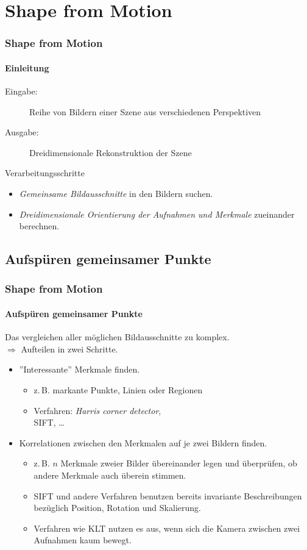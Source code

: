 \documentclass{beamer}
\begin{document}
\section{Shape from Motion}
\begin{frame}
	\frametitle{Shape from Motion}
	\framesubtitle{Einleitung}

	\begin{description}
		\item[Eingabe:] Reihe von Bildern einer Szene aus verschiedenen Perspektiven
		\item[Ausgabe:] Dreidimensionale Rekonstruktion der Szene
	\end{description}

	\begin{block}{Verarbeitungsschritte}
		\begin{itemize}
			\item \emph{Gemeinsame Bildausschnitte} in den Bildern suchen.
			\item \emph{Dreidimensionale Orientierung der Aufnahmen und Merkmale} zueinander berechnen.
		\end{itemize}
	\end{block}
\end{frame}


\subsection{Aufspüren gemeinsamer Punkte}
\begin{frame}
	\frametitle{Shape from Motion}
	\framesubtitle{Aufspüren gemeinsamer Punkte}
	
	Das vergleichen aller möglichen Bildausschnitte zu komplex. \pause \\
	$\Rightarrow$ Aufteilen in zwei Schritte.
	
	\begin{itemize}
		\item ''Interessante'' Merkmale finden.
			\begin{itemize}
				\item<3-> z.\,B. markante Punkte, Linien oder Regionen
				\item<3-> Verfahren: \emph{Harris corner detector}, \\
				\acf{SIFT}, \dots
			\end{itemize}
		\item Korrelationen zwischen den Merkmalen auf je zwei Bildern finden.
			\begin{itemize}
				\item<4-> z.\,B. $n$ Merkmale zweier Bilder übereinander legen und überprüfen, ob andere Merkmale auch überein stimmen.
				\item<4-> \ac{SIFT} und andere Verfahren benutzen bereits invariante Beschreibungen bezüglich Position, Rotation und Skalierung.
				\item<4-> Verfahren wie \ac{KLT} nutzen es aus, wenn sich die Kamera zwischen zwei Aufnahmen kaum bewegt.
			\end{itemize}
	\end{itemize}
\end{frame}
\end{document}
